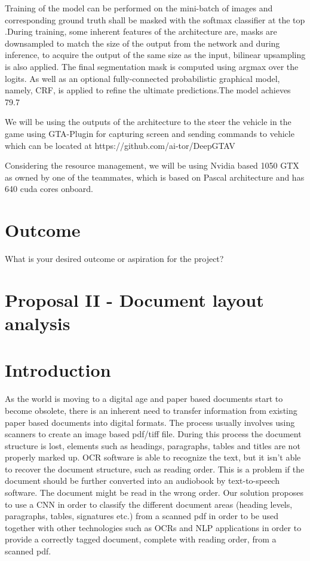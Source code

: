 \documentclass[10pt,twocolumn,letterpaper]{article}
\begin{document}
Training of the model can be performed on the mini-batch of images and corresponding ground truth shall be masked with the softmax classifier at the top .During training, some inherent features of the architecture are, masks are downsampled to match the size of the output from the network and during inference, to acquire the output of the same size as the input, bilinear upsampling is also applied. The final segmentation mask is computed using argmax over the logits. As well as an optional fully-connected probabilistic graphical model, namely, CRF, is applied to refine the ultimate predictions.The model achieves 79.7%

We will be using the outputs of the architecture to the steer the vehicle in the game using GTA-Plugin for capturing screen and sending commands to vehicle which can be located at https://github.com/ai-tor/DeepGTAV

Considering the resource management, we will be using Nvidia based 1050 GTX as owned by one of the teammates, which is based on Pascal architecture and has 640 cuda cores onboard.

\section{Outcome}
    What is your desired outcome or aspiration for the project?

%
%
\section*{Proposal II - Document layout analysis}
\setcounter{section}{0}

\section{Introduction}
As the world is moving to a digital age and paper based documents start to become obsolete, there is an inherent need to transfer information from existing paper based documents into digital formats. The process usually involves using scanners to create an image based pdf/tiff file. During this process the document structure is lost, elements such as headings, paragraphs, tables and titles are not properly marked up. OCR software is able to recognize the text, but it isn't able to recover the document structure, such as reading order. This is a problem if the document should be further converted into an audiobook by text-to-speech software. The document might be read in the wrong order. Our solution proposes to use a CNN in order to classify the different document areas (heading levels, paragraphs, tables, signatures etc.) from a scanned pdf in order to be used together with other technologies such as OCRs and NLP applications in order to provide a correctly tagged document, complete with reading order, from a scanned pdf.
\end{document}
